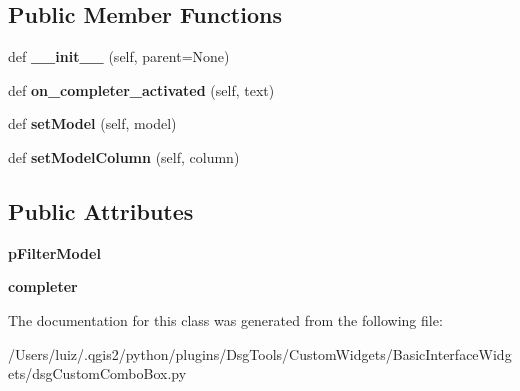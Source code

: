 \subsection*{Public Member Functions}
\begin{DoxyCompactItemize}
\item 
\mbox{\label{class_dsg_tools_1_1_custom_widgets_1_1_basic_interface_widgets_1_1dsg_custom_combo_box_1_1_dsg_custom_combo_box_ae495abe456ff2e77ff2df68a99b02fe8}} 
def {\bfseries \+\_\+\+\_\+init\+\_\+\+\_\+} (self, parent=None)
\item 
\mbox{\label{class_dsg_tools_1_1_custom_widgets_1_1_basic_interface_widgets_1_1dsg_custom_combo_box_1_1_dsg_custom_combo_box_a3c59145f63becf8630113731e0b48730}} 
def {\bfseries on\+\_\+completer\+\_\+activated} (self, text)
\item 
\mbox{\label{class_dsg_tools_1_1_custom_widgets_1_1_basic_interface_widgets_1_1dsg_custom_combo_box_1_1_dsg_custom_combo_box_a26bf9aaa8a16b8033b7ac3b099b43462}} 
def {\bfseries set\+Model} (self, model)
\item 
\mbox{\label{class_dsg_tools_1_1_custom_widgets_1_1_basic_interface_widgets_1_1dsg_custom_combo_box_1_1_dsg_custom_combo_box_a436bb61ec021a969093dfd93725ed366}} 
def {\bfseries set\+Model\+Column} (self, column)
\end{DoxyCompactItemize}
\subsection*{Public Attributes}
\begin{DoxyCompactItemize}
\item 
\mbox{\label{class_dsg_tools_1_1_custom_widgets_1_1_basic_interface_widgets_1_1dsg_custom_combo_box_1_1_dsg_custom_combo_box_a10e107491d2c8dc492240607ac68d28c}} 
{\bfseries p\+Filter\+Model}
\item 
\mbox{\label{class_dsg_tools_1_1_custom_widgets_1_1_basic_interface_widgets_1_1dsg_custom_combo_box_1_1_dsg_custom_combo_box_a48654a8dafa7ad9c8eea1508b928eab7}} 
{\bfseries completer}
\end{DoxyCompactItemize}


The documentation for this class was generated from the following file\+:\begin{DoxyCompactItemize}
\item 
/\+Users/luiz/.\+qgis2/python/plugins/\+Dsg\+Tools/\+Custom\+Widgets/\+Basic\+Interface\+Widgets/dsg\+Custom\+Combo\+Box.\+py\end{DoxyCompactItemize}
